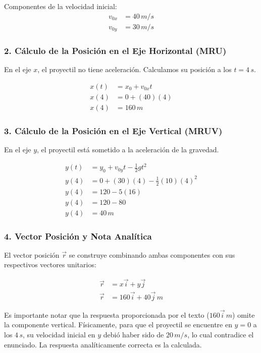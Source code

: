 \documentclass[12pt, a4paper]{article}
\begin{document}
Componentes de la velocidad inicial:
\begin{align*}
v_{0x} &= 40 \, \si{m/s} \\
v_{0y} &= 30 \, \si{m/s}
\end{align*}

\subsubsection*{2. Cálculo de la Posición en el Eje Horizontal (MRU)}
En el eje $x$, el proyectil no tiene aceleración. Calculamos su posición a los $t = 4 \, \si{s}$.

\begin{align*}
x(t) &= x_0 + v_{0x}t \\
x(4) &= 0 + (40)(4) \\
x(4) &= 160 \, \si{m}
\end{align*}

\subsubsection*{3. Cálculo de la Posición en el Eje Vertical (MRUV)}
En el eje $y$, el proyectil está sometido a la aceleración de la gravedad.

\begin{align*}
y(t) &= y_0 + v_{0y}t - \frac{1}{2}gt^2 \\
y(4) &= 0 + (30)(4) - \frac{1}{2}(10)(4)^2 \\
y(4) &= 120 - 5(16) \\
y(4) &= 120 - 80 \\
y(4) &= 40 \, \si{m}
\end{align*}

\subsubsection*{4. Vector Posición y Nota Analítica}
El vector posición $\vec{r}$ se construye combinando ambas componentes con sus respectivos vectores unitarios:

\begin{align*}
\vec{r} &= x\vec{i} + y\vec{j} \\
\vec{r} &= 160\vec{i} + 40\vec{j} \, \si{m}
\end{align*}

Es importante notar que la respuesta proporcionada por el texto ($160\vec{i} \, \si{m}$) omite la componente vertical. Físicamente, para que el proyectil se encuentre en $y = 0$ a los $4 \, \si{s}$, su velocidad inicial en $y$ debió haber sido de $20 \, \si{m/s}$, lo cual contradice el enunciado. La respuesta analíticamente correcta es la calculada.
\end{document}

